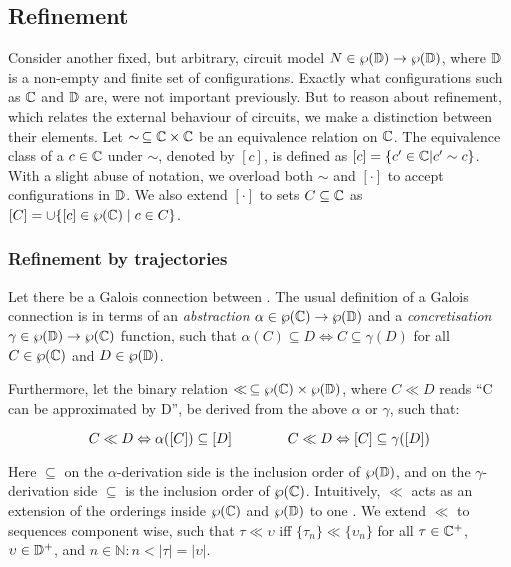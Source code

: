 \subsection{Refinement}

Consider another fixed, but arbitrary, circuit model $N \in \wp(\mathbb{D}) \rightarrow \wp(\mathbb{D})$, where $\mathbb{D}$ is a non-empty and finite set of configurations. Exactly what configurations such as $\mathbb{C}$ and $\mathbb{D}$ are, were not important previously. But to reason about refinement, which relates the external behaviour of circuits, we make a distinction between their elements. Let $\sim \, \subseteq \mathbb{C} \times \mathbb{C}$ be an equivalence relation on $\mathbb{C}$. The equivalence class of a $c \in \mathbb{C}$ under $\sim$, denoted by $[c]$, is defined as $[c] = \{ c' \in \mathbb{C} | c' \sim c \}$. With a slight abuse of notation, we overload both $\sim$ and $[\cdot]$ to accept configurations in $\mathbb{D}$. We also extend $[\cdot]$ to sets $C \subseteq \mathbb{C}$ as $[C] = \cup\{[c] \in \wp(\mathbb{C}) \mid c \in C \}$.


\subsubsection{Refinement by trajectories} %

Let there be a Galois connection between . The usual definition of a Galois connection is in terms of an \textit{abstraction} $\alpha \in \wp(\mathbb{C}) \rightarrow \wp(\mathbb{D})$ and a \textit{concretisation} $\gamma \in \wp(\mathbb{D}) \rightarrow \wp(\mathbb{C})$ function, such that $\alpha(C) \subseteq D \iff C \subseteq \gamma(D)$ for all $C \in \wp(\mathbb{C})$ and $D \in \wp(\mathbb{D})$. 

Furthermore, let the binary relation $\ll \, \subseteq \wp(\mathbb{C}) \times \wp(\mathbb{D})$, where $C \ll D$ reads ``C can be approximated by D'', be derived from the above $\alpha$ or $\gamma$, such that:

\begin{equation*}
C \ll D \Leftrightarrow \alpha([C]) \subseteq [D] \quad\quad\quad\quad C \ll D \Leftrightarrow [C] \subseteq \gamma([D])
\end{equation*}

\noindent Here $\subseteq$ on the $\alpha$-derivation side is the inclusion order of $\wp(\mathbb{D})$, and on the $\gamma$-derivation side $\subseteq$ is the inclusion order of $\wp(\mathbb{C})$. Intuitively, $\ll$ acts as an extension of the orderings inside $\wp(\mathbb{C})$ and $\wp(\mathbb{D})$ to one .  We extend $\ll$ to sequences component wise, such that $\tau \ll \upsilon$ iff $\{ \tau_{n} \} \ll \{ \upsilon_{n} \}$ for all $\tau \in \mathbb{C}^{+}$, $\upsilon \in \mathbb{D}^{+}$, and $n \in \mathbb{N} : n < | \tau | = | \upsilon |$.

